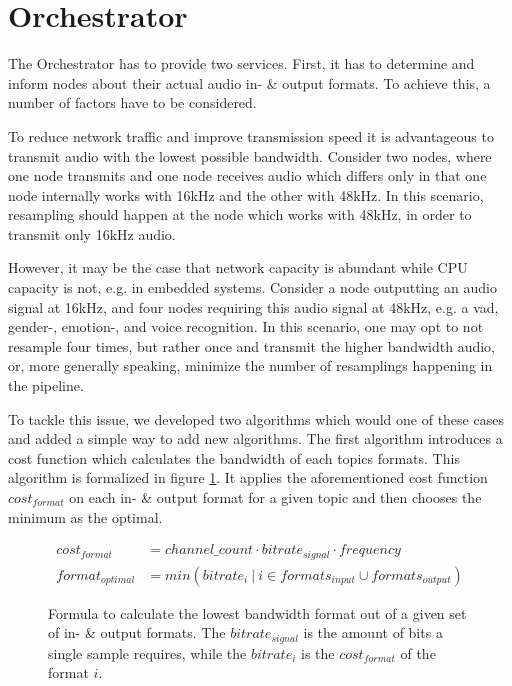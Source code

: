 


\section{Orchestrator}
\label{main:orc}

The Orchestrator has to provide two services.
First, it has to determine and inform nodes about their actual audio in- \& output formats.
To achieve this, a number of factors have to be considered.

To reduce network traffic and improve transmission speed it is advantageous to transmit audio with the lowest possible bandwidth.
Consider two nodes, where one node transmits and one node receives audio which differs only in that one node internally works with 16kHz and the other with 48kHz.
In this scenario, resampling should happen at the node which works with 48kHz, in order to transmit only 16kHz audio.

However, it may be the case that network capacity is abundant while CPU capacity is not, e.g. in embedded systems.
Consider a node outputting an audio signal at 16kHz, and four nodes requiring this audio signal at 48kHz, e.g. a \gls{vad}, gender-, emotion-, and voice recognition.
In this scenario, one may opt to not resample four times, but rather once and transmit the higher bandwidth audio, or, more generally speaking, minimize the number of resamplings happening in the pipeline.

To tackle this issue, we developed two algorithms which would one of these cases and added a simple way to add new algorithms.
The first algorithm introduces a cost function which calculates the bandwidth of each topics formats.
This algorithm is formalized in figure \ref{main:orc:resampling:formula:min_traffic}.
It applies the aforementioned cost function $cost_{format}$ on each in- \& output format for a given topic and then chooses the minimum as the optimal.

\begin{figure}
	\begin{align}
	cost_{format} &= channel\_count \cdot bitrate_{signal} \cdot frequency\\
	format_{optimal} &= min({bitrate_{i}\ |\ i \in formats_{input} \cup formats_{output}})
	\end{align}
	\caption{Formula to calculate the lowest bandwidth format out of a given set of in- \& output formats.
		The $bitrate_{signal}$ is the amount of bits a single sample requires, while the $bitrate_{i}$ is the $cost_{format}$ of the format $i$.}
	\label{main:orc:resampling:formula:min_traffic}
\end{figure}

